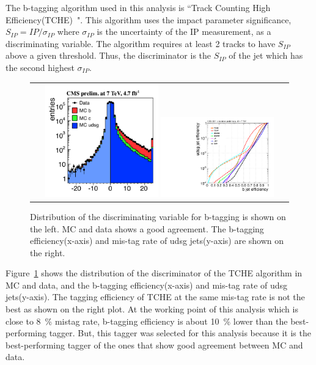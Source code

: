 The b-tagging algorithm used in this analysis is 
``Track Counting High Efficiency(TCHE)~\cite{Chatrchyan:1494669}".
This algorithm uses the impact parameter significance, $S_{IP} = IP / \sigma_{IP}$ 
where $\sigma_{IP}$ is the uncertainty of the IP measurement, 
as a discriminating variable. The algorithm requires at least 2 tracks to have $S_{IP}$ 
above a given threshold. Thus, the discriminator is the $S_{IP}$ of the jet 
which has the second highest $\sigma_{IP}$. 

\begin{figure}[htp] 
\centering 
\begin{tabular}{c} 
\includegraphics[width=0.45\textwidth]{figures/TCHE.pdf}
\includegraphics[width=0.45\textwidth]{figures/Figure_007-a.pdf}
\end{tabular} 
\caption{Distribution of the discriminating variable for b-tagging is shown 
on the left. MC and data shows a good agreement.   
The b-tagging efficiency(x-axis) and mis-tag rate of udsg jets(y-axis) 
are shown on the right.}
\label{fig:btagperformance} 
\end{figure} 
Figure~\ref{fig:btagperformance} shows the distribution of the discriminator of the 
TCHE algorithm in MC and data, and 
the b-tagging efficiency(x-axis) and mis-tag rate of udsg jets(y-axis). 
The tagging efficiency of TCHE at the same mis-tag rate is not the best as 
shown on the right plot. At the working point of this analysis which is close 
to 8~\% mistag rate, b-tagging efficiency is about 10~\% lower than the 
best-performing tagger. But, this tagger was selected for this analysis 
because it is the best-performing tagger of the ones that show good agreement 
between MC and data. 
